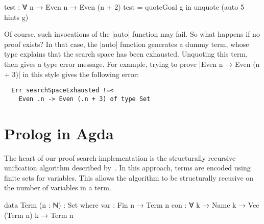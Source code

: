 \documentclass[preprint]{sigplanconf}
\begin{document}
\begin{code}
  test : ∀ {n} → Even n → Even (n + 2)
  test = quoteGoal g in unquote (auto 5 hints g)
\end{code}

Of course, such invocations of the |auto| function may fail. So what happens
if no proof exists? In that case, the |auto| function generates a dummy term,
whose type explains that the search space has been exhausted. Unquoting this
term, then gives a type error message. For example, trying to prove |Even n →
Even (n + 3)| in this style gives the following error:

\begin{verbatim}
  Err searchSpaceExhausted !=<
    Even .n -> Even (.n + 3) of type Set
\end{verbatim}



\section{Prolog in Agda}
\label{sec:prolog}

The heart of our proof search implementation is the structurally recursive
unification algorithm described by~\citet{mcbride}. In this approach, terms
are encoded using finite sets for variables. This allows the algorithm to
be structurally recusive on the number of variables in a term.

\begin{code}
  data Term (n : ℕ) : Set where
    var  : Fin n → Term n
    con  : ∀ {k} → Name k → Vec (Term n) k → Term n
\end{code}
\end{document}
